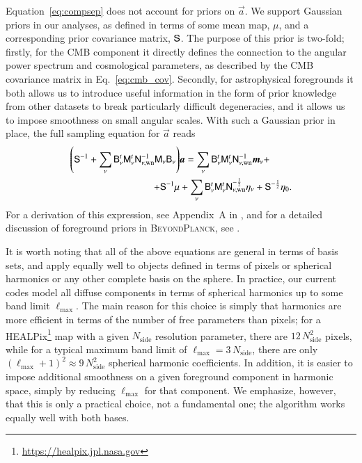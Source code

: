 \documentclass[twocolumn]{aa}
\renewcommand{\a}[0]{\vec{a}}
\newcommand{\m}[0]{\vec{m}}
\newcommand{\B}[0]{\tens{B}}
\newcommand{\N}[0]{\tens{N}}
\newcommand{\M}[0]{\tens{M}}
\renewcommand{\S}[0]{\tens{S}}
\newcommand{\BP}{\textsc{BeyondPlanck}}
\begin{document}
Equation~\eqref{eq:compsep} does not account for priors on $\a$. We
support Gaussian priors in our analyses, as defined in terms of some
mean map, $\mu$, and a corresponding prior covariance matrix,
$\S$. The purpose of this prior is two-fold; firstly, for the CMB
component it directly defines the connection to the angular power
spectrum and cosmological parameters, as described by the CMB
covariance matrix in Eq.~\eqref{eq:cmb_cov}. Secondly, for
astrophysical foregrounds it both allows us to introduce useful
information in the form of prior knowledge from other datasets to
break particularly difficult degeneracies, and it allows us to impose
smoothness on small angular scales. With such a Gaussian prior in
place, the full sampling equation for $\a$ reads
\begin{equation}
  \begin{split}
  \left(\S^{-1} + \sum_{\nu}\B_\nu^t\M_\nu^t\N^{-1}_{\nu,\mathrm{wn}}\M_\nu\B_\nu\right)&\a
  = \sum_\nu \B_{\nu}^t\M_{\nu}^t\N_{\nu,\mathrm{wn}}^{-1}\m_{\nu} +\\
  +\S^{-1}\mu &+
  \sum_{\nu}
  \B_{\nu}^t\M_{\nu}^t\N_{\nu,\mathrm{wn}}^{-\frac{1}{2}}\eta_{\nu} +
  \S^{-\frac{1}{2}}\eta_0.
  \end{split}
  \label{eq:compsep_with_prior}
\end{equation}
For a derivation of this expression, see Appendix~A in \citet{bp01},
and for a detailed discussion of foreground priors in \BP, see
\citet{bp13}.

It is worth noting that all of the above equations are general in
terms of basis sets, and apply equally well to objects defined in
terms of pixels or spherical harmonics or any other complete basis on
the sphere. In practice, our current codes model all diffuse
components in terms of spherical harmonics up to some band limit
$\ell_{\mathrm{max}}$. The main reason for this choice is simply that
harmonics are more efficient in terms of the number of free parameters
than pixels; for a HEALPix\footnote{\url{https://healpix.jpl.nasa.gov}} map \citep{gorski2005} with a given $N_{\mathrm{side}}$
resolution parameter, there are $12\,N_{\mathrm{side}}^2$ pixels,
while for a typical maximum band limit of
$\ell_{\mathrm{max}}=3\,N_{\mathrm{side}}$, there are only
$(\ell_{\mathrm{max}}+1)^2 \approx 9\,N_{\mathrm{side}}^2$ spherical
harmonic coefficients. In addition, it is easier to impose additional
smoothness on a given foreground component in harmonic space, simply
by reducing $\ell_{\mathrm{max}}$ for that component. We emphasize,
however, that this is only a practical choice, not a fundamental one;
the algorithm works equally well with both bases.
\end{document}
